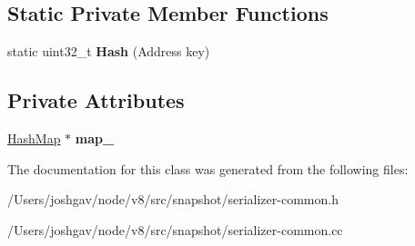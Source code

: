\subsection*{Static Private Member Functions}
\begin{DoxyCompactItemize}
\item 
static uint32\+\_\+t {\bfseries Hash} (Address key)\hypertarget{classv8_1_1internal_1_1_external_reference_encoder_a05855c068a51c441bd635940c9ba2732}{}\label{classv8_1_1internal_1_1_external_reference_encoder_a05855c068a51c441bd635940c9ba2732}

\end{DoxyCompactItemize}
\subsection*{Private Attributes}
\begin{DoxyCompactItemize}
\item 
\hyperlink{classv8_1_1internal_1_1_template_hash_map_impl}{Hash\+Map} $\ast$ {\bfseries map\+\_\+}\hypertarget{classv8_1_1internal_1_1_external_reference_encoder_a83c1c803d776f8f582ef385e6a3eb20b}{}\label{classv8_1_1internal_1_1_external_reference_encoder_a83c1c803d776f8f582ef385e6a3eb20b}

\end{DoxyCompactItemize}


The documentation for this class was generated from the following files\+:\begin{DoxyCompactItemize}
\item 
/\+Users/joshgav/node/v8/src/snapshot/serializer-\/common.\+h\item 
/\+Users/joshgav/node/v8/src/snapshot/serializer-\/common.\+cc\end{DoxyCompactItemize}
